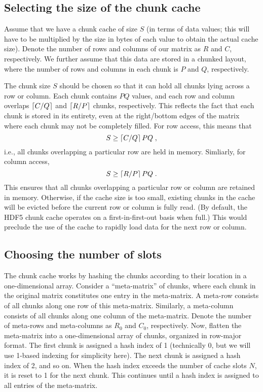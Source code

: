 \documentclass{article}
\begin{document}
\subsection{Selecting the size of the chunk cache}
Assume that we have a chunk cache of size $S$ (in terms of data values; this will have to be multiplied by the size in bytes of each value to obtain the actual cache size).
Denote the number of rows and columns of our matrix as $R$ and $C$, respectively. 
We further assume that this data are stored in a chunked layout, where the number of rows and columns in each chunk is $P$ and $Q$, respectively.

The chunk size $S$ should be chosen so that it can hold all chunks lying across a row or column.
Each chunk contains $PQ$ values, and each row and column overlaps $\left \lceil C/Q \right \rceil$ and $\left \lceil R/P \right \rceil$ chunks, respectively.
This reflects the fact that each chunk is stored in its entirety, even at the right/bottom edges of the matrix where each chunk may not be completely filled.
For row access, this means that 
\begin{equation}
S \ge \left \lceil C/Q \right \rceil PQ \;, 
\end{equation}
i.e., all chunks overlapping a particular row are held in memory. Simliarly, for column access, 
\begin{equation}
S \ge \left \lceil R/P \right \rceil PQ \;.
\end{equation}
This ensures that all chunks overlapping a particular row or column are retained in memory.
Otherwise, if the cache size is too small, existing chunks in the cache will be evicted before the current row or column is fully read.
(By default, the HDF5 chunk cache operates on a first-in-first-out basis when full.)
This would preclude the use of the cache to rapidly load data for the next row or column.

\subsection{Choosing the number of slots}
The chunk cache works by hashing the chunks according to their location in a one-dimensional array.
Consider a ``meta-matrix'' of chunks, where each chunk in the original matrix constitutes one entry in the meta-matrix.
A meta-row consists of all chunks along one row of this meta-matrix.
Similarly, a meta-column consists of all chunks along one column of the meta-matrix. 
Denote the number of meta-rows and meta-columns as $R_0$ and $C_0$, respectively.
Now, flatten the meta-matrix into a one-dimensional array of chunks, organized in row-major format.
The first chunk is assigned a hash index of 1 (technically 0, but we will use 1-based indexing for simplicity here).
The next chunk is assigned a hash index of 2, and so on.
When the hash index exceeds the number of cache slots $N$, it is reset to 1 for the next chunk.
This continues until a hash index is assigned to all entries of the meta-matrix.
\end{document}
